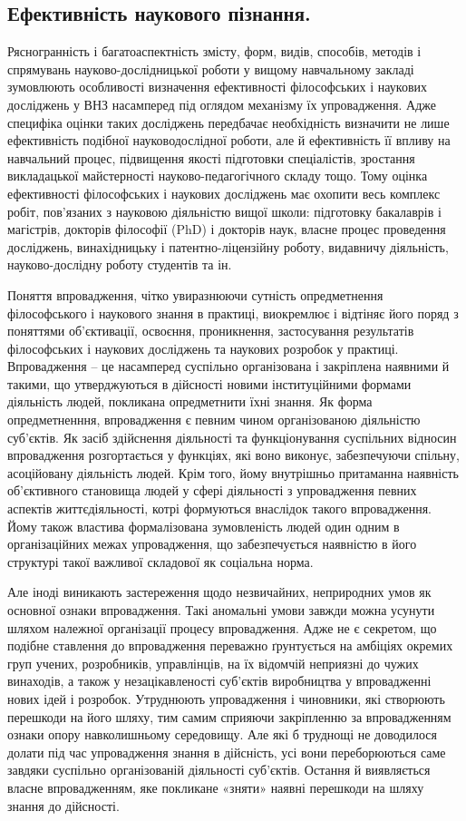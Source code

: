 \subsection{Ефективність наукового пізнання.} Рясногранність і багатоаспектність
змісту, форм, видів, способів, методів і спрямувань нау\-ко\-во-дос\-лід\-ниць\-кої
роботи у вищому навчальному закладі зумовлюють особливості визначення
ефективності філософських і наукових досліджень у ВНЗ насамперед під
оглядом механізму їх упровадження. Адже специфіка оцінки таких досліджень
передбачає необхідність визначити не лише ефективність подібної науководослідної роботи, але й ефективність її впливу на навчальний процес,
підвищення якості підготовки спеціалістів, зростання викладацької
майстерності науково-педагогічного складу тощо. Тому оцінка ефективності
філософських і наукових досліджень має охопити весь комплекс робіт,
пов’язаних з науковою діяльністю вищої школи: підготовку бакалаврів і
магістрів, докторів філософії (PhD) і докторів наук, власне процес проведення
досліджень, винахідницьку і патентно-ліцензійну роботу, видавничу діяльність,
науково-дослідну роботу студентів та ін.

Поняття впровадження, чітко увиразнюючи сутність опредметнення
філософського і наукового знання в практиці, виокремлює і відтіняє його поряд
з поняттями об’єктива\-ції, освоєння, проникнення, застосування результатів
філософських і наукових досліджень та наукових розробок у практиці.
Впровадження – це насамперед суспільно організована і закріплена наявними й
такими, що утверджуються в дійсності новими інституційними формами
діяльність людей, покликана опредметнити їхні знання. Як форма
опредметненння, впровадження є певним чином організованою діяльністю
суб’єктів. Як засіб здійснення діяльності та функціонування суспільних
відносин впровадження розгортається у функціях, які воно виконує,
забезпечуючи спільну, асоційовану діяльність людей. Крім того, йому
внутрішньо притаманна наявність об’єктивного становища людей у сфері
діяльності з упровадження певних аспектів життєдіяльності, котрі формуються
внаслідок такого впровадження. Йому також властива формалізована
зумовленість людей один одним в організаційних межах упровадження, що
забезпечується наявністю в його структурі такої важливої складової як
соціальна норма.

Але іноді виникають застереження щодо незвичайних, неприродних умов як
основної ознаки впровадження. Такі аномальні умови завжди можна усунути
шляхом належної організації процесу впровадження. Адже не є секретом, що
подібне ставлення до впровадження переважно ґрунтується на амбіціях окремих
груп учених, розробників, управлінців, на їх відомчій неприязні до чужих
винаходів, а також у незацікавленості суб’єктів виробництва у впровадженні
нових ідей і розробок. Утруднюють упровадження і чиновники, які створюють
перешкоди на його шляху, тим самим сприяючи закріпленню за впровадженням
ознаки опору навколишньому середовищу. Але які б труднощі не доводилося
долати під час упровадження знання в дійсність, усі вони переборюються саме
завдяки суспільно організованій діяльності суб’єктів. Остання й виявляється
власне впровадженням, яке покликане «зняти» наявні перешкоди на шляху
знання до дійсності.


